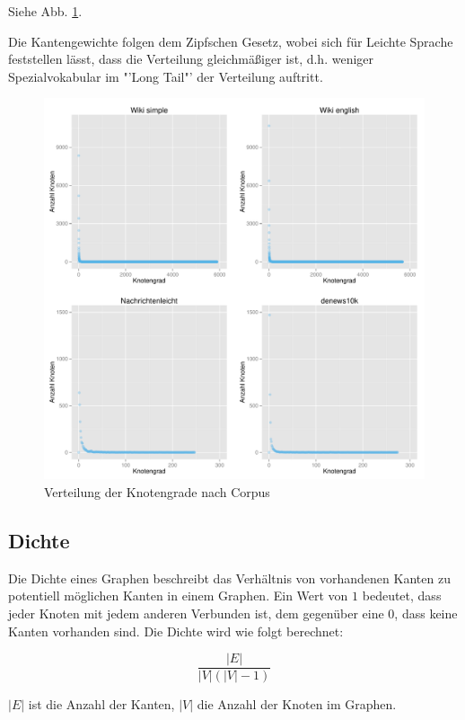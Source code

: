 \documentclass[11pt, a4paper]{article}
\begin{document}
Siehe Abb. \ref{fig-vdeg}.


Die Kantengewichte folgen dem Zipfschen Gesetz, wobei sich f\"ur Leichte Sprache
feststellen l\"asst, dass die Verteilung gleichm\"a\ss{}iger ist, d.h. weniger
Spezialvokabular im "'Long Tail"' der Verteilung auftritt.

\begin{figure}
    \centering
        \includegraphics[scale=.5]{vdeg_plots.pdf}
    \caption{Verteilung der Knotengrade nach Corpus}
    \label{fig-vdeg}
\end{figure}


\subsection{Dichte}

Die Dichte eines Graphen beschreibt das Verhältnis von vorhandenen Kanten zu
potentiell möglichen Kanten in einem Graphen. Ein Wert von $1$ bedeutet, dass
jeder Knoten mit jedem anderen Verbunden ist, dem gegenüber eine $0$, dass keine
Kanten vorhanden sind. Die Dichte wird wie folgt berechnet:

$$
    \frac{|E|}{|V|(|V|-1)}
$$

$|E|$ ist die Anzahl der Kanten, $|V|$ die Anzahl der Knoten im Graphen. 
\end{document}
